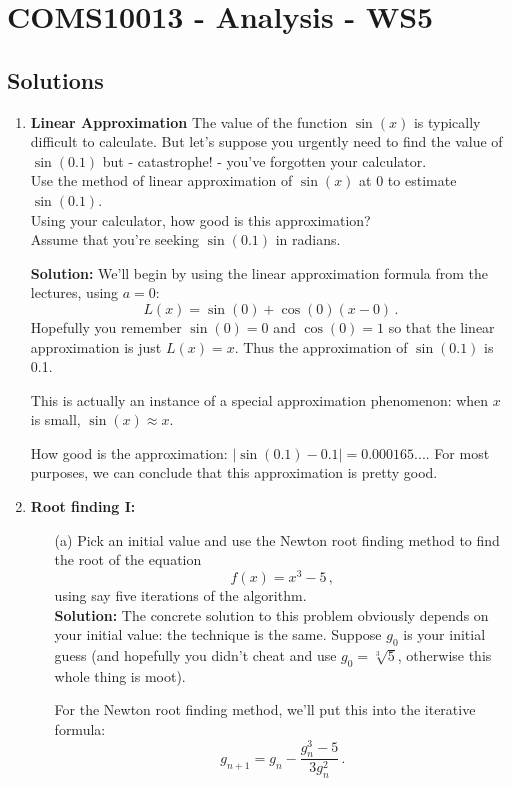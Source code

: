 \documentclass[11pt,a4paper]{scrartcl}
\begin{document}
\section*{COMS10013 - Analysis - WS5}

\subsection*{Solutions}
\begin{enumerate}
\item {\textbf{Linear Approximation}}
The value of the function $\sin(x)$ is typically difficult to calculate. But let's suppose you urgently need to find the value of $\sin(0.1)$ but - catastrophe! - you've forgotten your calculator. \\
Use the method of linear approximation of $\sin(x)$ at $0$ to estimate $\sin(0.1)$. \\
Using your calculator, how good is this approximation? \\
Assume that you're seeking $\sin(0.1)$ in radians. 

\textbf{Solution:} We'll begin by using the linear approximation formula from the lectures, using $a=0$: 
\[
L(x) = \sin(0) + \cos(0)(x-0)\,.
\]
Hopefully you remember $\sin(0) = 0$ and $\cos(0)=1$ so that the linear approximation is just $L(x) = x$.
Thus the approximation of $\sin(0.1)$ is 0.1.

This is actually an instance of a special approximation phenomenon: when $x$ is small, $\sin(x) \approx x$. 

How good is the approximation: $|\sin(0.1) - 0.1| =  0.000165....$ For most purposes, we can conclude that this approximation is pretty good. 

\item {\textbf{Root finding I: }}
\begin{enumerate}
    \item[(a)] Pick an initial value and use the Newton root finding method to find the root of the equation 
    \[
    f(x) = x^3 - 5\,,
    \]
    using say five iterations of the algorithm.\\
\textbf{Solution: }    The concrete solution to this problem obviously depends on your initial value: the technique is the same. Suppose $g_0$ is your initial guess (and hopefully you didn't cheat and use $g_0=\sqrt[3]{5}$, otherwise this whole thing is moot).

    For the Newton root finding method, we'll put this into the iterative formula:
    \[
    g_{n+1} = g_n - \frac{g_n^3-5}{3g_n^2}\,. 
    \]


\end{enumerate}
\end{enumerate}
\end{document}
